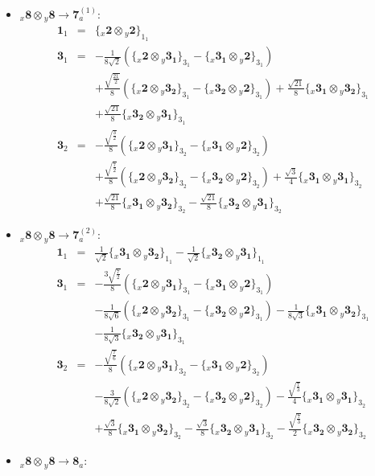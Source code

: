 \documentclass[english]{article}
\newcommand{\rep}[1]{\mathbf{#1}}
\newcommand{\repx}[2]{{}_{#2}\mathbf{#1}}
\newcommand{\subcg}[3]{\big\{ \repx{#1}{x}\otimes\repx{#2}{y}\big\}^{}_{#3}}
\begin{document}
\begin{itemize}
\begin{eqnarray*}
\end{eqnarray*}
\item $\repx{8}{x}\otimes\repx{8}{y}\to\rep{7}_{a}^{(1)}$:
\begin{eqnarray*}
\rep{1}_{1} &=& \subcg{2}{2}{1_{1}}
\\
\rep{3}_{1} &=& -\frac{1}{8 \sqrt{2}}\left(\subcg{2}{3_{1}}{3_{1}}-\subcg{3_{1}}{2}{3_{1}}\right) \\ 
 & & +\frac{\sqrt{\frac{21}{2}}}{8}\left(\subcg{2}{3_{2}}{3_{1}}-\subcg{3_{2}}{2}{3_{1}}\right)+\frac{\sqrt{21}}{8}\subcg{3_{1}}{3_{2}}{3_{1}} \\ 
 & & +\frac{\sqrt{21}}{8}\subcg{3_{2}}{3_{1}}{3_{1}}
\\
\rep{3}_{2} &=& -\frac{\sqrt{\frac{3}{2}}}{8}\left(\subcg{2}{3_{1}}{3_{2}}-\subcg{3_{1}}{2}{3_{2}}\right) \\ 
 & & +\frac{\sqrt{\frac{7}{2}}}{8}\left(\subcg{2}{3_{2}}{3_{2}}-\subcg{3_{2}}{2}{3_{2}}\right)+\frac{\sqrt{3}}{4}\subcg{3_{1}}{3_{1}}{3_{2}} \\ 
 & & +\frac{\sqrt{21}}{8}\subcg{3_{1}}{3_{2}}{3_{2}}-\frac{\sqrt{21}}{8}\subcg{3_{2}}{3_{1}}{3_{2}}
\end{eqnarray*}
\item $\repx{8}{x}\otimes\repx{8}{y}\to\rep{7}_{a}^{(2)}$:
\begin{eqnarray*}
\rep{1}_{1} &=& \frac{1}{\sqrt{2}}\subcg{3_{1}}{3_{2}}{1_{1}}-\frac{1}{\sqrt{2}}\subcg{3_{2}}{3_{1}}{1_{1}}
\\
\rep{3}_{1} &=& -\frac{3 \sqrt{\frac{7}{2}}}{8}\left(\subcg{2}{3_{1}}{3_{1}}-\subcg{3_{1}}{2}{3_{1}}\right) \\ 
 & & -\frac{1}{8 \sqrt{6}}\left(\subcg{2}{3_{2}}{3_{1}}-\subcg{3_{2}}{2}{3_{1}}\right)-\frac{1}{8 \sqrt{3}}\subcg{3_{1}}{3_{2}}{3_{1}} \\ 
 & & -\frac{1}{8 \sqrt{3}}\subcg{3_{2}}{3_{1}}{3_{1}}
\\
\rep{3}_{2} &=& -\frac{\sqrt{\frac{7}{6}}}{8}\left(\subcg{2}{3_{1}}{3_{2}}-\subcg{3_{1}}{2}{3_{2}}\right) \\ 
 & & -\frac{3}{8 \sqrt{2}}\left(\subcg{2}{3_{2}}{3_{2}}-\subcg{3_{2}}{2}{3_{2}}\right)-\frac{\sqrt{\frac{7}{3}}}{4}\subcg{3_{1}}{3_{1}}{3_{2}} \\ 
 & & +\frac{\sqrt{3}}{8}\subcg{3_{1}}{3_{2}}{3_{2}}-\frac{\sqrt{3}}{8}\subcg{3_{2}}{3_{1}}{3_{2}}-\frac{\sqrt{\frac{7}{3}}}{2}\subcg{3_{2}}{3_{2}}{3_{2}}
\end{eqnarray*}
\item $\repx{8}{x}\otimes\repx{8}{y}\to\rep{8}_{a}$:
\begin{eqnarray*}

\end{eqnarray*}
\end{itemize}
\end{document}
